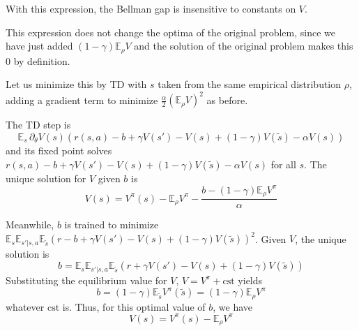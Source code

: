 \documentclass[11pt]{article}
\newcommand{\E}{\mathbb{E}}
\begin{document}
With this expression, the Bellman gap is insensitive to constants on $V$.

This expression does not change the optima of the original
problem, since we have just added $(1-\gamma)\E_\rho V$ and the solution
of the original problem makes this $0$ by definition.

Let us minimize this by TD with $s$ taken from the same
empirical distribution $\rho$, adding a gradient term to minimize
$\frac{\alpha}{2} (\E_\rho V)^2$ as before.

The TD step is
\begin{equation}
\E_s \,\partial_\theta V(s)\left(
r(s,a)-b+\gamma V(s')-V(s)+(1-\gamma)V(\tilde s)-\alpha V(s)
\right)
\end{equation}
and its fixed point solves $r(s,a)-b+\gamma V(s')-V(s)+(1-\gamma)V(\tilde
s)-\alpha V(s)$ for all $s$. The unique solution for $V$ given $b$ is
\begin{equation}
V(s)=V^\pi(s)-\E_\rho V^\pi-\frac{b-(1-\gamma)\E_\rho V^\pi}{\alpha}
\end{equation}

Meanwhile, $b$ is trained to minimize $\E_s\E_{s'|s,a}\E_{\tilde s} (r-b+\gamma
V(s')-V(s)+(1-\gamma)V(\tilde s))^2$. Given $V$, the unique solution is
\begin{equation}
b=\E_s\E_{s'|s,a}\E_{\tilde s}(r+\gamma
V(s')-V(s)+(1-\gamma)V(\tilde s))
\end{equation}
Substituting the equilibrium value for $V$, $V=V^\pi+\mathrm{cst}$ yields
\begin{equation}
b=(1-\gamma)\E_{\tilde s} V^\pi(\tilde s)=(1-\gamma)\E_\rho V^\pi
\end{equation}
whatever $\mathrm{cst}$ is. Thus, for this optimal value of $b$, we have
\begin{equation}
V(s)=V^\pi(s)-\E_\rho V^\pi
\end{equation}
\end{document}
